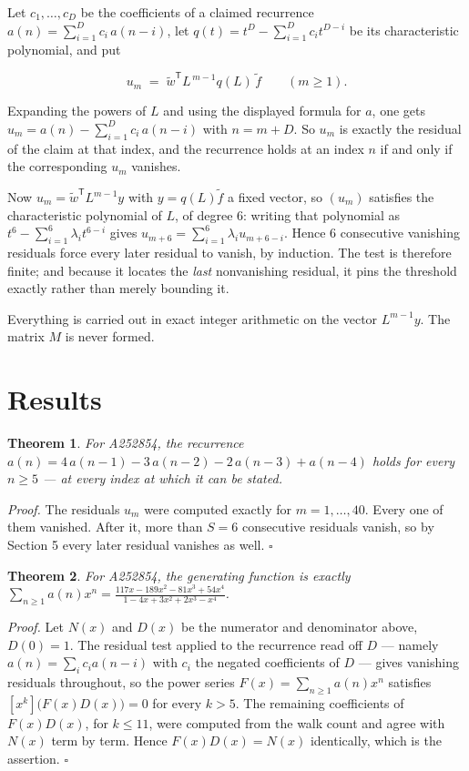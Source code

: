 \documentclass[11pt]{article}
\newtheorem{theorem}{Theorem}
\theoremstyle{definition}
\begin{document}
Let $c_1,\dots,c_D$ be the coefficients of a claimed recurrence $a(n) = \sum_{i=1}^{D} c_i\,a(n-i)$, let $q(t) = t^{D} - \sum_{i=1}^{D} c_i t^{D-i}$ be its characteristic polynomial, and put

\[u_m \;=\; \tilde w^{\mathsf T} L^{\,m-1} q(L)\,\tilde f \qquad (m \ge 1).\]

Expanding the powers of $L$ and using the displayed formula for $a$, one gets $u_m = a(n) - \sum_{i=1}^{D} c_i\,a(n-i)$ with $n = m + D$. So $u_m$ is exactly the residual of the claim at that index, and the recurrence holds at an index $n$ if and only if the corresponding $u_m$ vanishes.

Now $u_m = \tilde w^{\mathsf T} L^{m-1} y$ with $y = q(L)\tilde f$ a fixed vector, so $(u_m)$ satisfies the characteristic polynomial of $L$, of degree $6$: writing that polynomial as $t^{6} - \sum_{i=1}^{6} \lambda_i t^{6-i}$ gives $u_{m+6} = \sum_{i=1}^{6} \lambda_i u_{m+6-i}$. Hence $6$ consecutive vanishing residuals force every later residual to vanish, by induction. The test is therefore finite; and because it locates the {\itshape last} nonvanishing residual, it pins the threshold exactly rather than merely bounding it.

Everything is carried out in exact integer arithmetic on the vector $L^{m-1}y$. The matrix $M$ is never formed.

\section{Results}

\begin{theorem} For A252854, the recurrence $a(n) = 4\,a(n-1) - 3\,a(n-2) - 2\,a(n-3) + a(n-4)$ holds for every $n \ge 5$ --- at every index at which it can be stated.\end{theorem}

{\itshape Proof.} The residuals $u_m$ were computed exactly for $m = 1,\dots,40$. Every one of them vanished. After it, more than $S = 6$ consecutive residuals vanish, so by Section 5 every later residual vanishes as well. $\square$

\begin{theorem} For A252854, the generating function is exactly $\sum_{n\ge 1} a(n)x^n = \frac{117x - 189x^{2} - 81x^{3} + 54x^{4}}{1 - 4x + 3x^{2} + 2x^{3} - x^{4}}$.\end{theorem}

{\itshape Proof.} Let $N(x)$ and $D(x)$ be the numerator and denominator above, $D(0)=1$. The residual test applied to the recurrence read off $D$ --- namely $a(n) = \sum_i c_i a(n-i)$ with $c_i$ the negated coefficients of $D$ --- gives vanishing residuals throughout, so the power series $F(x)=\sum_{n\ge 1}a(n)x^n$ satisfies $[x^k]\bigl(F(x)D(x)\bigr) = 0$ for every $k > 5$. The remaining coefficients of $F(x)D(x)$, for $k \le 11$, were computed from the walk count and agree with $N(x)$ term by term. Hence $F(x)D(x) = N(x)$ identically, which is the assertion. $\square$
\end{document}
